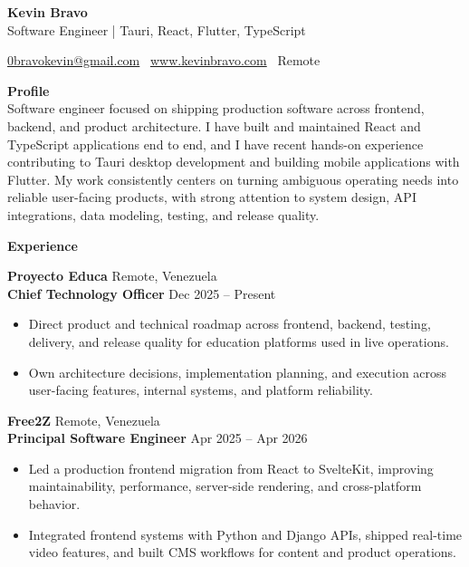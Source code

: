 \documentclass[11pt]{article}
\begin{document}
\begin{center}
    {\LARGE \textbf{Kevin Bravo}}\\
    Software Engineer | Tauri, React, Flutter, TypeScript \\
    \hrulefill
\end{center}

\begin{center}
    \href{mailto:0bravokevin@gmail.com}{0bravokevin@gmail.com} \textbullet\ \href{http://www.kevinbravo.com}{www.kevinbravo.com} \textbullet\ Remote
\end{center}

\vspace{2pt}

\textbf{Profile}\\
Software engineer focused on shipping production software across frontend, backend, and product architecture. I have built and maintained React and TypeScript applications end to end, and I have recent hands-on experience contributing to Tauri desktop development and building mobile applications with Flutter. My work consistently centers on turning ambiguous operating needs into reliable user-facing products, with strong attention to system design, API integrations, data modeling, testing, and release quality.

\begin{center}
    \textbf{Experience}
\end{center}

\textbf{Proyecto Educa} \hfill Remote, Venezuela \\
\textbf{Chief Technology Officer} \hfill Dec 2025 -- Present
\begin{itemize}
    \item Direct product and technical roadmap across frontend, backend, testing, delivery, and release quality for education platforms used in live operations.
    \item Own architecture decisions, implementation planning, and execution across user-facing features, internal systems, and platform reliability.
\end{itemize}

\vspace{10pt}

\textbf{Free2Z} \hfill Remote, Venezuela \\
\textbf{Principal Software Engineer} \hfill Apr 2025 -- Apr 2026
\begin{itemize}
    \item Led a production frontend migration from React to SvelteKit, improving maintainability, performance, server-side rendering, and cross-platform behavior.
    \item Integrated frontend systems with Python and Django APIs, shipped real-time video features, and built CMS workflows for content and product operations.
\end{itemize}
\end{document}
